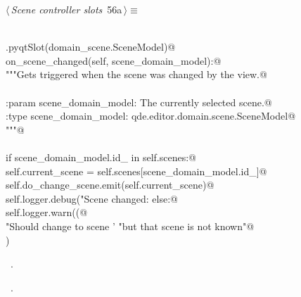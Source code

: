 \documentclass[
    a4paper,      %
    10pt,         %
    openright,    %
    notitlepage,  %
    parskip=half, %
]{scrreprt}       %
\theoremstyle{definition}                    %
\begin{document}
\begin{flushleft} \small
\begin{minipage}{\linewidth}\label{scrap87}\raggedright\small
{} $\langle\,${\itshape Scene controller slots}\nobreak\ {\footnotesize {56a}}$\,\rangle\equiv$
\vspace{-1exm}
\begin{list}{}{} \item
\mbox{}\lstinline@@\\
\mbox{}\lstinline@QtCore.pyqtSlot(domain_scene.SceneModel)@\\
\mbox{}\lstinline@def on_scene_changed(self, scene_domain_model):@\\
\mbox{}\lstinline@    """Gets triggered when the scene was changed by the view.@\\
\mbox{}\lstinline@@\\
\mbox{}\lstinline@    :param scene_domain_model: The currently selected scene.@\\
\mbox{}\lstinline@    :type  scene_domain_model: qde.editor.domain.scene.SceneModel@\\
\mbox{}\lstinline@    """@\\
\mbox{}\lstinline@@\\
\mbox{}\lstinline@    if scene_domain_model.id_ in self.scenes:@\\
\mbox{}\lstinline@        self.current_scene = self.scenes[scene_domain_model.id_]@\\
\mbox{}\lstinline@        self.do_change_scene.emit(self.current_scene)@\\
\mbox{}\lstinline@        self.logger.debug("Scene changed: %s", self.current_scene)@\\
\mbox{}\lstinline@    else:@\\
\mbox{}\lstinline@        self.logger.warn((@\\
\mbox{}\lstinline@            "Should change to scene '%s', "@\\
\mbox{}\lstinline@            "but that scene is not known"@\\
\mbox{}\lstinline@        ) % scene_domain_model)@\\
\mbox{}\lstinline@@{\NWsep}
\end{list}
\vspace{-1.5ex}
\footnotesize
\begin{list}{}{\setlength{\itemsep}{-\parsep}\setlength{\itemindent}{-\leftmargin}}
\item \NWtxtMacroDefBy\ .
\item \NWtxtMacroRefIn\ .

\item{}
\end{list}
\end{minipage}\vspace{4ex}
\end{flushleft}
\end{document}
